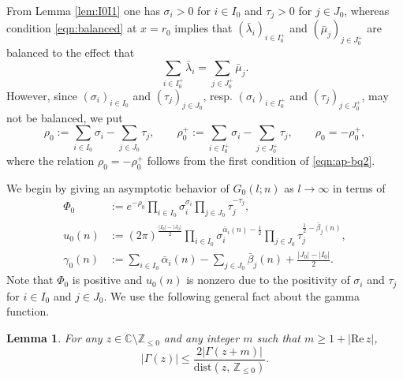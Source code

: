 \documentclass[a4paper,12pt]{article}
\theoremstyle{plain}
\newtheorem{lemma}[theorem]{Lemma}
\def\rRe{\mathrm{Re}}
\def\C{\mathbb{C}}
\def\Z{\mathbb{Z}}
\def\vG{\varGamma}
\begin{document}
From Lemma \ref{lem:I0I1} one has $\sigma_i > 0$ for $i \in I_0$ and $\tau_j > 0$ 
for $j \in J_0$, whereas condition \eqref{eqn:balanced} at $x = r_0$ implies that  
$( \bar{\lambda}_i )_{i \in I_0^+}$ and $( \bar{\mu}_j )_{j \in J_0^+}$ 
are balanced to the effect that     
\begin{equation} \label{eqn:balance-bq} 
\sum_{i \in I_0^+} \bar{\lambda}_i = \sum_{j \in J_0^+} \bar{\mu}_j.    
\end{equation}
However, since $(\sigma_i)_{i \in I_0}$ and $(\tau_j)_{j \in J_0}$, resp. 
$(\sigma_i)_{i \in I_0^+}$ and $(\tau_j)_{j \in J_0^+}$, may not be balanced, we put  
\begin{equation} \label{eqn:rho0}
\rho_0 := \sum_{i \in I_0} \sigma_i - \sum_{j \in J_0} \tau_j, \qquad 
\rho_0^+ := \sum_{i \in I_0^+} \sigma_i - \sum_{j \in J_0^+} \tau_j, 
\qquad \rho_0 = - \rho_0^+,  
\end{equation}
where the relation $\rho_0 = - \rho_0^+$ follows from the first 
condition of \eqref{eqn:ap-bq2}. 
\par
We begin by giving an asymptotic behavior of $G_0(l; n)$ as $l \to \infty$ in terms of  
\begin{align*} 
\Phi_0 &:= e^{-\rho_0} \prod_{i \in I_0} \sigma_i^{\sigma_i} 
\prod_{j \in J_0} \tau_j^{-\tau_j},  \\
u_0(n) &:= (2 \pi)^{\frac{|I_0|-|J_0|}{2}} 
\prod_{i \in I_0} \sigma_i^{\bar{\alpha}_i(n) - \frac{1}{2} } 
\prod_{j \in J_0} \tau_j^{ \frac{1}{2} - \bar{\beta}_j(n)},  \\  
\gamma_0(n) &:= \sum_{i \in I_0} \bar{\alpha}_i(n) - 
\sum_{j \in J_0} \bar{\beta}_j(n) + \frac{|J_0|-|I_0|}{2}. 
\end{align*} 
Note that $\Phi_0$ is positive and $u_0(n)$ is nonzero due to the positivity of 
$\sigma_i$ and $\tau_j$ for $i \in I_0$ and $j \in J_0$. 
We use the following general fact about the gamma function.  
\begin{lemma} \label{lem:dist}
For any $z \in \C \setminus \Z_{\le 0}$ and any integer $m$ such that 
$m \ge 1+ |\rRe \, z|$, 
\[
|\vG(z)| \le \dfrac{2 |\vG(z+m)|}{\mathrm{dist}(z, \, \Z_{\le 0})}. 
\]
\end{lemma}
\end{document}
